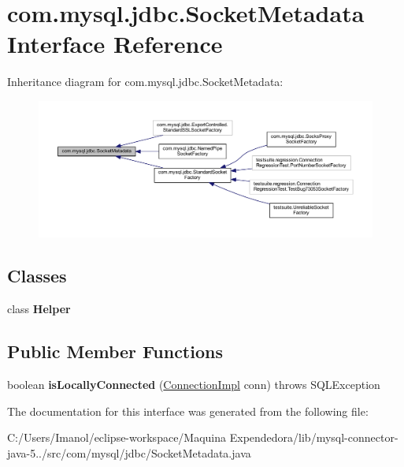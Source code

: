 \hypertarget{interfacecom_1_1mysql_1_1jdbc_1_1_socket_metadata}{}\section{com.\+mysql.\+jdbc.\+Socket\+Metadata Interface Reference}
\label{interfacecom_1_1mysql_1_1jdbc_1_1_socket_metadata}


Inheritance diagram for com.\+mysql.\+jdbc.\+Socket\+Metadata\+:
\nopagebreak
\begin{figure}[H]
\begin{center}
\leavevmode
\includegraphics[width=350pt]{interfacecom_1_1mysql_1_1jdbc_1_1_socket_metadata__inherit__graph}
\end{center}
\end{figure}
\subsection*{Classes}
\begin{DoxyCompactItemize}
\item 
class {\bfseries Helper}
\end{DoxyCompactItemize}
\subsection*{Public Member Functions}
\begin{DoxyCompactItemize}
\item 
\mbox{\label{interfacecom_1_1mysql_1_1jdbc_1_1_socket_metadata_a60525ae835459d805f474cc573d422ac}} 
boolean {\bfseries is\+Locally\+Connected} (\mbox{\hyperlink{classcom_1_1mysql_1_1jdbc_1_1_connection_impl}{Connection\+Impl}} conn)  throws S\+Q\+L\+Exception
\end{DoxyCompactItemize}


The documentation for this interface was generated from the following file\+:\begin{DoxyCompactItemize}
\item 
C\+:/\+Users/\+Imanol/eclipse-\/workspace/\+Maquina Expendedora/lib/mysql-\/connector-\/java-\/5../src/com/mysql/jdbc/Socket\+Metadata.\+java\end{DoxyCompactItemize}
